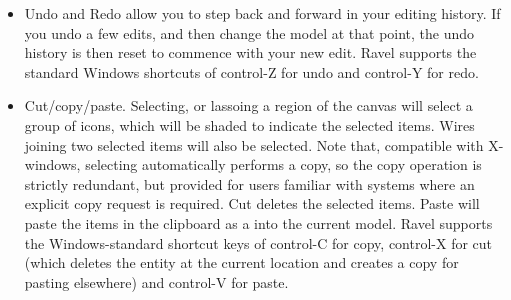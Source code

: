 \begin{itemize}
\item\label{edit:undo} Undo and Redo allow you to step back and forward in your editing history. If you undo a few edits, and then change the model at that point, the undo history is then reset to commence with your new edit. Ravel supports the standard Windows shortcuts of control-Z for undo and control-Y for redo.

\item\label{edit:copy} Cut/copy/paste. Selecting, or lassoing a region of the canvas will select a group of icons, which will be shaded to indicate the selected items. Wires joining two selected items will also be selected. Note that, compatible with X-windows, selecting automatically performs a copy, so the copy operation is strictly redundant, but provided for users familiar with systems where an explicit copy request is required. Cut deletes the selected items. Paste will paste the items in the clipboard as a  into the current model. Ravel supports the Windows-standard shortcut keys of control-C for copy, control-X for cut (which deletes the entity at the current location and creates a copy for pasting elsewhere) and control-V for paste.


\end{itemize}
